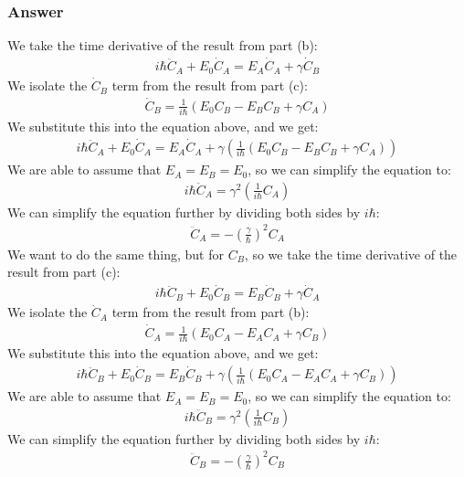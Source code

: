 \documentclass{article}
\begin{document}
\subsubsection{Answer}
We take the time derivative of the result from part (b):
\begin{align}
i \hbar \ddot{C}_A + E_0 \dot{C}_A = E_A \dot{C}_A + \gamma \dot{C}_B
\end{align}
We isolate the $\dot{C}_B$ term from the result from part (c):
\begin{align}
\dot{C}_B = \frac{1}{i \hbar} \left( E_0 C_B - E_B C_B + \gamma C_A \right)
\end{align}
We substitute this into the equation above, and we get:
\begin{align}
i \hbar \ddot{C}_A + E_0 \dot{C}_A = E_A \dot{C}_A + \gamma \left( \frac{1}{i \hbar} \left( E_0 C_B - E_B C_B + \gamma C_A \right) \right)
\end{align}
We are able to assume that $E_A = E_B = E_0$, so we can simplify the equation to:
\begin{align}
i \hbar \ddot{C}_A = \gamma ^2 \left( \frac{1}{i \hbar} C_A \right)
\end{align}
We can simplify the equation further by dividing both sides by $i \hbar$:
\begin{align}
\boxed{\ddot{C}_A = -\left(\frac{\gamma}{\hbar}\right)^2 C_A}
\end{align}
We want to do the same thing, but for $C_B$, so we take the time derivative of the result from part (c):
\begin{align}
i \hbar \ddot{C}_B + E_0 \dot{C}_B = E_B \dot{C}_B + \gamma \dot{C}_A
\end{align}
We isolate the $\dot{C}_A$ term from the result from part (b):
\begin{align}
\dot{C}_A = \frac{1}{i \hbar} \left( E_0 C_A - E_A C_A + \gamma C_B \right)
\end{align}
We substitute this into the equation above, and we get:
\begin{align}
i \hbar \ddot{C}_B + E_0 \dot{C}_B = E_B \dot{C}_B + \gamma \left( \frac{1}{i \hbar} \left( E_0 C_A - E_A C_A + \gamma C_B \right) \right)
\end{align}
We are able to assume that $E_A = E_B = E_0$, so we can simplify the equation to:
\begin{align}
i \hbar \ddot{C}_B = \gamma ^2 \left( \frac{1}{i \hbar} C_B \right)
\end{align}
We can simplify the equation further by dividing both sides by $i \hbar$:
\begin{align}
\boxed{\ddot{C}_B = -\left(\frac{\gamma}{\hbar}\right)^2 C_B}
\end{align}
\end{document}
